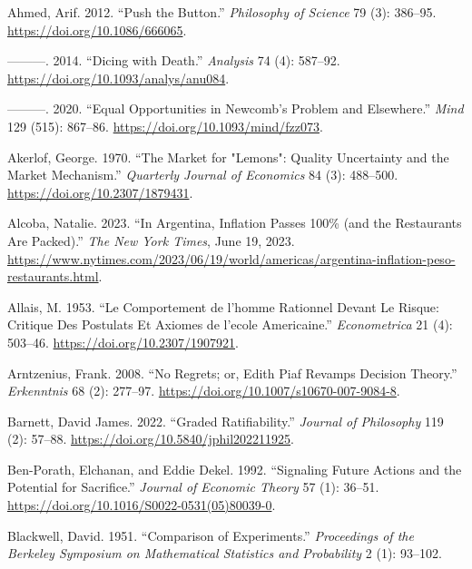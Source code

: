 \documentclass[
  12pt,
  letterpaper,
  DIV=11,
  numbers=noendperiod]{scrreprt}
\newlength{\cslhangindent}
\newlength{\cslentryspacingunit} %
\newenvironment{CSLReferences}[2] %
 {%
  \setlength{\parindent}{0pt}
  \ifodd #1
  \let\oldpar\par
  \def\par{\hangindent=\cslhangindent\oldpar}
  \fi
  \setlength{\parskip}{#2\cslentryspacingunit}
 }%
 {}
\begin{document}
\hypertarget{refs}{}
\begin{CSLReferences}{1}{0}
\leavevmode{}%
Ahmed, Arif. 2012. {``Push the Button.''} \emph{Philosophy of Science}
79 (3): 386--95. \url{https://doi.org/10.1086/666065}.

\leavevmode{}%
---------. 2014. {``Dicing with Death.''} \emph{Analysis} 74 (4):
587--92. \url{https://doi.org/10.1093/analys/anu084}.

\leavevmode{}%
---------. 2020. {``Equal Opportunities in Newcomb's Problem and
Elsewhere.''} \emph{Mind} 129 (515): 867--86.
\url{https://doi.org/10.1093/mind/fzz073}.

\leavevmode{}%
Akerlof, George. 1970. {``The Market for "Lemons": Quality Uncertainty
and the Market Mechanism.''} \emph{Quarterly Journal of Economics} 84
(3): 488--500. \url{https://doi.org/10.2307/1879431}.

\leavevmode{}%
Alcoba, Natalie. 2023. {``In Argentina, Inflation Passes 100\% (and the
Restaurants Are Packed).''} \emph{The New York Times}, June 19, 2023.
\url{https://www.nytimes.com/2023/06/19/world/americas/argentina-inflation-peso-restaurants.html}.

\leavevmode{}%
Allais, M. 1953. {``Le Comportement de l'homme Rationnel Devant Le
Risque: Critique Des Postulats Et Axiomes de l'ecole Americaine.''}
\emph{Econometrica} 21 (4): 503--46.
\url{https://doi.org/10.2307/1907921}.

\leavevmode{}%
Arntzenius, Frank. 2008. {``No Regrets; or, Edith Piaf Revamps Decision
Theory.''} \emph{Erkenntnis} 68 (2): 277--97.
\url{https://doi.org/10.1007/s10670-007-9084-8}.

\leavevmode{}%
Barnett, David James. 2022. {``Graded Ratifiability.''} \emph{Journal of
Philosophy} 119 (2): 57--88.
\url{https://doi.org/10.5840/jphil202211925}.

\leavevmode{}%
Ben-Porath, Elchanan, and Eddie Dekel. 1992. {``Signaling Future Actions
and the Potential for Sacrifice.''} \emph{Journal of Economic Theory} 57
(1): 36--51. \url{https://doi.org/10.1016/S0022-0531(05)80039-0}.

\leavevmode{}%
Blackwell, David. 1951. {``Comparison of Experiments.''}
\emph{Proceedings of the Berkeley Symposium on Mathematical Statistics
and Probability} 2 (1): 93--102.


\end{CSLReferences}
\end{document}
